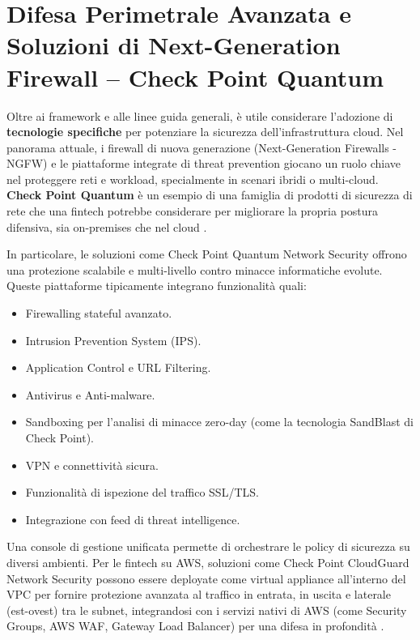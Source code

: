\section{Difesa Perimetrale Avanzata e Soluzioni di Next-Generation Firewall – Check Point Quantum}
\label{sec:checkpoint_quantum}
Oltre ai framework e alle linee guida generali, è utile considerare l’adozione di \textbf{tecnologie specifiche} per potenziare la sicurezza dell’infrastruttura cloud. Nel panorama attuale, i firewall di nuova generazione (Next-Generation Firewalls - NGFW) e le piattaforme integrate di threat prevention giocano un ruolo chiave nel proteggere reti e workload, specialmente in scenari ibridi o multi-cloud. \textbf{Check Point Quantum} è un esempio di una famiglia di prodotti di sicurezza di rete che una fintech potrebbe considerare per migliorare la propria postura difensiva, sia on-premises che nel cloud \cite{checkpointQuantum}.

In particolare, le soluzioni come Check Point Quantum Network Security offrono una protezione scalabile e multi-livello contro minacce informatiche evolute. Queste piattaforme tipicamente integrano funzionalità quali:
\begin{itemize}
    \item Firewalling stateful avanzato.
    \item Intrusion Prevention System (IPS).
    \item Application Control e URL Filtering.
    \item Antivirus e Anti-malware.
    \item Sandboxing per l'analisi di minacce zero-day (come la tecnologia SandBlast di Check Point).
    \item VPN e connettività sicura.
    \item Funzionalità di ispezione del traffico SSL/TLS.
    \item Integrazione con feed di threat intelligence.
\end{itemize}
Una console di gestione unificata permette di orchestrare le policy di sicurezza su diversi ambienti. Per le fintech su AWS, soluzioni come Check Point CloudGuard Network Security possono essere deployate come virtual appliance all'interno del VPC per fornire protezione avanzata al traffico in entrata, in uscita e laterale (est-ovest) tra le subnet, integrandosi con i servizi nativi di AWS (come Security Groups, AWS WAF, Gateway Load Balancer) per una difesa in profondità \cite{awsCheckPoint}.

